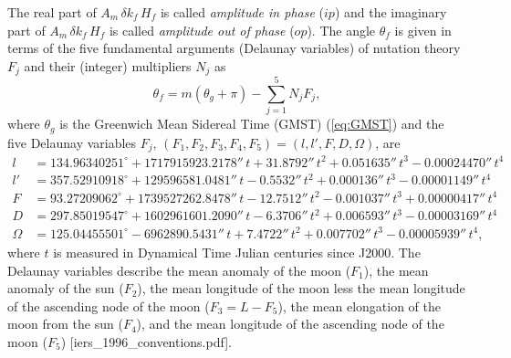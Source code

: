 \documentclass[11pt,dvipsnames]{thesis}
\begin{document}
The real part of $A_m\,\delta k_f\,H_f$ is called \textit{amplitude in phase} ($ip$) and the imaginary part of $A_m\,\delta k_f\,H_f$ is called \textit{amplitude out of phase} ($op$). The angle $\theta_f$ is given in terms of the five fundamental arguments (Delaunay variables) of nutation theory $F_j$ and their (integer) multipliers $N_j$ as
\begin{equation}
\theta_f = m(\theta_g + \pi) - \sum_{j = 1}^5 N_j F_j,
\end{equation}
where $\theta_g$ is the Greenwich Mean Sidereal Time (GMST) (\ref{eq:GMST}) and the five Delaunay variables $F_j$, $(F_1, F_2, F_3, F_4, F_5) = (l, l', F, D, \Omega)$, are 
\begin{align}
l &= 134.96340251^\circ + 1717915923.2178''\,t + 31.8792''\,t^2 + 0.051635''\,t^3 - 0.00024470''\,t^4 \\
l' &=  357.52910918^\circ + 129596581.0481''\,t - 0.5532''\,t^2 + 0.000136''\,t^3 - 0.00001149''\,t^4 \\
F &= 93.27209062^\circ + 1739527262.8478''\,t - 12.7512''\,t^2 - 0.001037''\,t^3 + 0.00000417''\,t^4 \\
D &= 297.85019547^\circ + 1602961601.2090''\,t - 6.3706''\,t^2 + 0.006593''\,t^3 - 0.00003169''\,t^4 \\
\Omega &= 125.04455501^\circ - 6962890.5431''\,t + 7.4722''\,t^2 + 0.007702''\,t^3 - 0.00005939''\,t^4,
\end{align}
where $t$ is measured in Dynamical Time Julian centuries since J2000.
The Delaunay variables describe the mean anomaly of the moon ($F_1$), the mean anomaly of the sun ($F_2$), the mean longitude of the moon less the mean longitude of the ascending node of the moon ($F_3 = L - F_5$), the mean elongation of the moon from the sun ($F_4$), and the mean longitude of the ascending node of the moon ($F_5$) [iers\_1996\_conventions.pdf].
\end{document}
